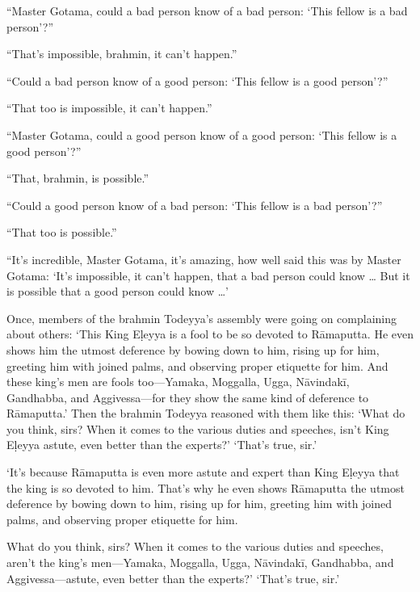 \documentclass[12pt,openany]{book}%
\begin{document}
“Master Gotama, could a bad person know of a bad person: ‘This fellow is a bad person’?” 

“That’s impossible, brahmin, it can’t happen.” 

“Could a bad person know of a good person: ‘This fellow is a good person’?” 

“That too is impossible, it can’t happen.” 

“Master Gotama, could a good person know of a good person: ‘This fellow is a good person’?” 

“That, brahmin, is possible.” 

“Could a good person know of a bad person: ‘This fellow is a bad person’?” 

“That too is possible.” 

“It’s incredible, Master Gotama, it’s amazing, how well said this was by Master Gotama: ‘It’s impossible, it can’t happen, that a bad person could know … But it is possible that a good person could know …’ 

Once, members of the brahmin Todeyya’s assembly were going on complaining about others: ‘This King \textsanskrit{Eḷeyya} is a fool to be so devoted to \textsanskrit{Rāmaputta}. He even shows him the utmost deference by bowing down to him, rising up for him, greeting him with joined palms, and observing proper etiquette for him. And these king’s men are fools too—Yamaka, Moggalla, Ugga, \textsanskrit{Nāvindakī}, Gandhabba, and Aggivessa—for they show the same kind of deference to \textsanskrit{Rāmaputta}.’ Then the brahmin Todeyya reasoned with them like this: ‘What do you think, sirs? When it comes to the various duties and speeches, isn’t King \textsanskrit{Eḷeyya} astute, even better than the experts?’ ‘That’s true, sir.’ 

‘It’s because \textsanskrit{Rāmaputta} is even more astute and expert than King \textsanskrit{Eḷeyya} that the king is so devoted to him. That’s why he even shows \textsanskrit{Rāmaputta} the utmost deference by bowing down to him, rising up for him, greeting him with joined palms, and observing proper etiquette for him. 

What do you think, sirs? When it comes to the various duties and speeches, aren’t the king’s men—Yamaka, Moggalla, Ugga, \textsanskrit{Nāvindakī}, Gandhabba, and Aggivessa—astute, even better than the experts?’ ‘That’s true, sir.’ 
\end{document}
